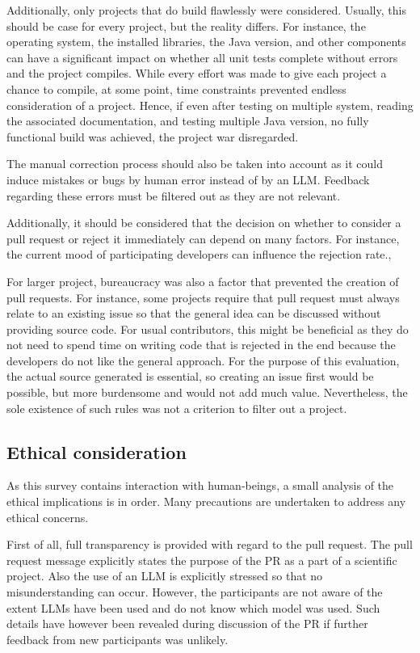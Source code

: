 Additionally, only projects that do build flawlessly were considered. Usually, this should be case for every project, but the reality differs. For instance, the operating system, the installed libraries, the Java version, and other components can have a significant impact on whether all unit tests complete without errors and the project compiles.  While every effort was made to give each project a chance to compile, at some point, time constraints prevented endless consideration of a project. Hence, if even after testing on multiple system, reading the associated documentation, and testing multiple Java version, no fully functional build was achieved, the project war disregarded.

The manual correction process should also be taken into account as it could induce mistakes or bugs by human error instead of by an \ac{LLM}. Feedback regarding these errors must be filtered out as they are not relevant. 


Additionally, it should be considered that the decision on whether to consider a pull request or reject it immediately can depend on many factors. For instance,  the current mood of participating developers can influence the rejection rate.\cite{detecting_emotional}, 

For larger project, bureaucracy was also a factor that prevented the creation of pull requests. For instance, some projects require that pull request must always relate to an existing issue so that the general idea can be discussed without providing source code. For usual contributors, this might be beneficial as they do not need to spend time on writing code that is rejected in the end because the developers do not like the general approach. For the purpose of this evaluation, the actual source generated is essential, so creating an issue first would be possible,  but more burdensome  and would not add much value. Nevertheless, the sole existence of such rules was not a criterion to filter out a project. 

\subsection{Ethical consideration}
As this survey contains interaction with human-beings, a small analysis of the ethical implications is in order. Many precautions are undertaken to address any ethical concerns. 

First of all, full transparency is provided  with regard to the pull request. The pull request message explicitly states the purpose of the PR as a part of a scientific project. Also the use of an \ac{LLM} is explicitly stressed so that no misunderstanding can occur. However, the participants are not aware of the extent \acp{LLM} have been used and do not know which model was used. Such details have however been revealed during discussion of the PR if further feedback from new participants was unlikely.

